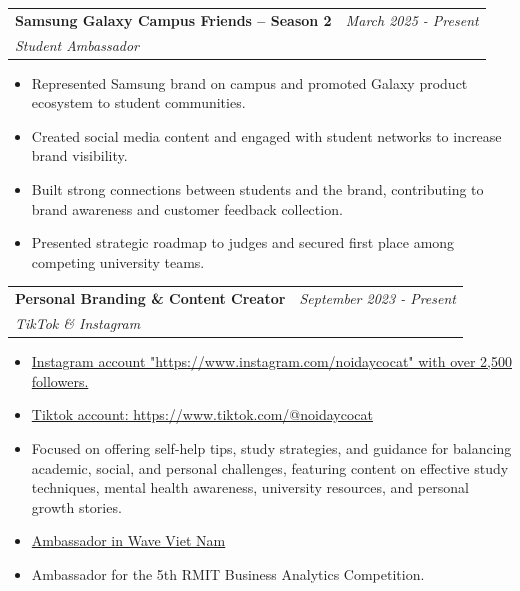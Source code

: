 \documentclass[a4paper,11pt]{article}
\makeatletter
\newcommand{\resumeSubheading}[4]{
\vspace{0.5mm}\item
    \begin{tabular*}{0.98\textwidth}[t]{l@{\extracolsep{\fill}}r}
        \textbf{#1} & \textit{\footnotesize{#4}} \\
        \textit{\footnotesize{#3}} &  \footnotesize{#2}\\
    \end{tabular*}
    \vspace{-2.4mm}
}
\newcommand{\resumeItemListStart}{\begin{justify}\begin{itemize}[leftmargin=3ex, rightmargin=2ex, noitemsep,labelsep=1.2mm,itemsep=0mm]\small}
\newcommand{\resumeItemListEnd}{\end{itemize}\end{justify}\vspace{-2mm}}
\makeatother
\begin{document}
  \resumeSubheading
      {Samsung Galaxy Campus Friends – Season 2}{}
      {Student Ambassador}{March 2025 - Present}
      \resumeItemListStart
    \item {Represented Samsung brand on campus and promoted Galaxy product ecosystem to student communities.}
    \item {Created social media content and engaged with student networks to increase brand visibility.}
    \item {Built strong connections between students and the brand, contributing to brand awareness and customer feedback collection.}
    \item {Presented strategic roadmap to judges and secured first place among competing university teams.}
    \resumeItemListEnd
  \resumeSubheading
      {Personal Branding \& Content Creator}{}
      {TikTok \& Instagram}{September 2023 - Present}
      \resumeItemListStart
    \item {\href{https://www.instagram.com/noidaycocat/?fbclid=IwZXh0bgNhZW0CMTAAAR09V_7vBPw93t3OyyV4qqC_rN4ueNG9ZxrA3XU8ZTLBgWWKfNnydI5sRX0_aem_AYYAk81qPFjmXWMCWsQBIjkfzxvt3HQsTyTQOEjNpGHVMBALoTm2otWF7k5kuxMo-B8uTfCgZhBO3cCj6K8gelBu}{Instagram account "https://www.instagram.com/noidaycocat" with over 2,500 followers.}}
    \item {\href{https://www.tiktok.com/@noidaycocat}{Tiktok account: https://www.tiktok.com/@noidaycocat }}
    \item {Focused on offering self-help tips, study strategies, and guidance for balancing academic, social, and personal challenges, featuring content on effective study techniques, mental health awareness, university resources, and personal growth stories.}
    
    \item {\href{https://www.facebook.com/WaveVietnam.project/}{Ambassador in Wave Viet Nam}}
    \item {Ambassador for the 5th RMIT Business Analytics Competition.}
    
    \resumeItemListEnd

    
\end{document}
